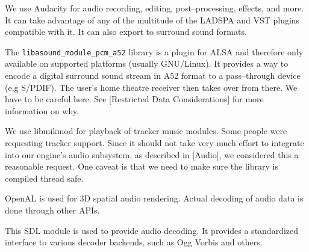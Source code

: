 

\startitemize[4]

We use Audacity for audio recording, editing, post--processing, effects, and more. It can take advantage of any of the multitude of the LADSPA and VST plugins compatible with it. It can also export to surround sound formats.


The {\tt libasound_module_pcm_a52} library is a plugin for ALSA and therefore only available on supported platforms (usually GNU/Linux). It provides a way to encode a digital surround sound stream in A52 format to a pass--through device (e.g S/PDIF). The user's home theatre receiver then takes over from there. We have to be careful here. See [{Restricted Data Considerations}] for more information on why.


We use libmikmod for playback of tracker music modules. Some people were requesting tracker support. Since it should not take very much effort to integrate into our engine's audio subsystem, as described in [Audio], we considered this a reasonable request. One caveat is that we need to make sure the library is compiled thread safe.


OpenAL is used for 3D spatial audio rendering. Actual decoding of audio data is done through other APIs.


This SDL module is used to provide audio decoding. It provides a standardized interface to various decoder backends, such as Ogg Vorbis and others.
\stopitemize

